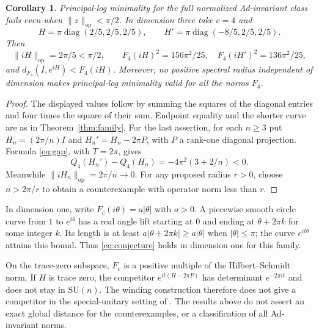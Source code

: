 \documentclass[11pt]{article}
\newcommand{\diag}{\operatorname{diag}}
\newcommand{\op}{\mathrm{op}}
\newtheorem{corollary}[theorem]{Corollary}
\begin{document}
\begin{corollary}\label{cor:half}
Principal-log minimality for the full normalized Ad-invariant class
fails even when $\|z\|_{\op}<\pi/2$. In dimension three take $c=4$ and
\[
 H=\pi\diag(2/5,2/5,2/5),\qquad H'=\pi\diag(-8/5,2/5,2/5).
\]
Then
\[
 \|iH\|_{\op}=2\pi/5<\pi/2,\qquad
 F_4(iH)^2=156\pi^2/25,\quad
 F_4(iH')^2=136\pi^2/25,
\]
and $d_{F_4}(I,e^{iH})<F_4(iH)$.
Moreover, no positive spectral radius independent of dimension makes
principal-log minimality valid for all the norms $F_4$.
\end{corollary}
\begin{proof}
The displayed values follow by summing the squares of the diagonal
entries and four times the square of their sum. Endpoint equality and
the shorter curve are as in Theorem~\ref{thm:family}.
For the last assertion, for each $n\geq3$ put
$H_n=(2\pi/n)I$ and $H_n'=H_n-2\pi P$, with $P$ a rank-one
diagonal projection. Formula \eqref{eq:gap}, with $T=2\pi$, gives
\[
 Q_4(H_n')-Q_4(H_n)=-4\pi^2(3+2/n)<0.
\]
Meanwhile $\|iH_n\|_{\op}=2\pi/n\to0$. For any proposed
radius $r>0$, choose $n>2\pi/r$ to obtain a counterexample with
operator norm less than $r$.
\end{proof}

In dimension one, write $F_c(i\theta)=a|\theta|$ with $a>0$.
A piecewise smooth circle curve from $1$ to $e^{i\theta}$ has a real
angle lift starting at $0$ and ending at $\theta+2\pi k$ for some integer
$k$. Its length is at least $a|\theta+2\pi k|\geq a|\theta|$ when
$|\theta|\leq\pi$; the curve $e^{it\theta}$ attains this bound.
Thus \eqref{eq:conjecture} holds in dimension one for this family.

On the trace-zero subspace, $F_c$ is a positive multiple of the
Hilbert--Schmidt norm. If $H$ is trace zero, the competitor
$e^{it(H-2\pi P)}$ has determinant $e^{-2\pi it}$ and does not stay in
$\mathrm{SU}(n)$. The winding construction therefore does not give a
competitor in the special-unitary setting of \cite[Theorem 4.1]{Larotonda}.
The results above do not assert an exact global distance for the
counterexamples, or a classification of all Ad-invariant norms.
\end{document}
